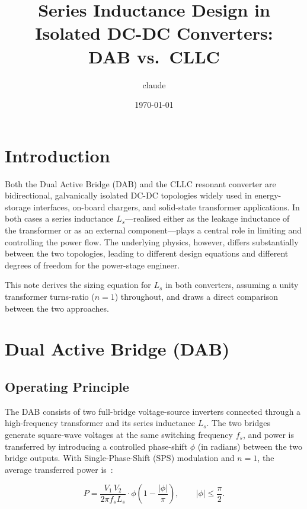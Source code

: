 \documentclass[a4paper, 11pt]{article}
\title{\textbf{Series Inductance Design in Isolated DC-DC Converters:\\
DAB vs.\ CLLC}}
\author{claude}
\date{\today}
\begin{document}
\maketitle
\tableofcontents
\bigskip

\section{Introduction}

Both the Dual Active Bridge (DAB) and the CLLC resonant converter are
bidirectional, galvanically isolated DC-DC topologies widely used in
energy-storage interfaces, on-board chargers, and solid-state
transformer applications.  In both cases a series inductance
$L_s$—realised either as the leakage inductance of the transformer or
as an external component—plays a central role in limiting and
controlling the power flow.  The underlying physics, however, differs
substantially between the two topologies, leading to different design
equations and different degrees of freedom for the power-stage
engineer.

This note derives the sizing equation for $L_s$ in both converters,
assuming a unity transformer turns-ratio ($n = 1$) throughout, and
draws a direct comparison between the two approaches.

\section{Dual Active Bridge (DAB)}

\subsection{Operating Principle}

The DAB consists of two full-bridge voltage-source inverters connected
through a high-frequency transformer and its series inductance $L_s$.
The two bridges generate square-wave voltages at the same switching
frequency $f_s$, and power is transferred by introducing a controlled
phase-shift $\phi$ (in radians) between the two bridge outputs.  With
Single-Phase-Shift (SPS) modulation and $n = 1$, the average
transferred power is~\cite{dedoncker1991}:

\begin{equation}
  P = \frac{V_1 \, V_2}{2\pi f_s L_s}
      \cdot \phi \!\left(1 - \frac{|\phi|}{\pi}\right),
  \qquad |\phi| \leq \frac{\pi}{2}.
  \label{eq:dab_power}
\end{equation}
\end{document}
